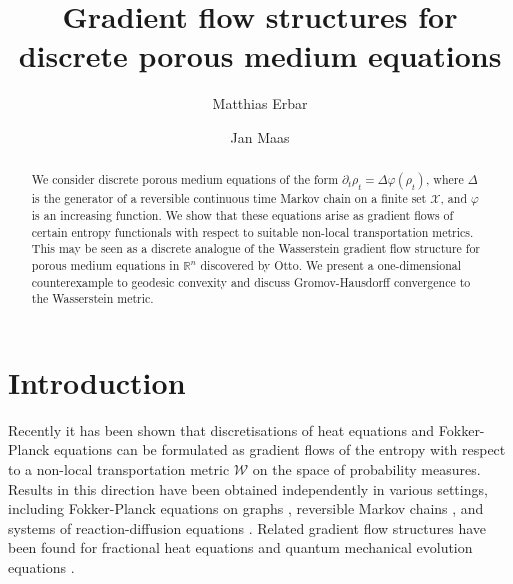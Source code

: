 \documentclass[a4paper,11pt,reqno]{amsart}
\theoremstyle{plain}
\theoremstyle{remark}
\numberwithin{equation}{section}
\begin{document}
\title
[Discrete porous medium equations]
{Gradient flow structures for discrete porous medium equations}

\author{Matthias Erbar}
\author{Jan Maas}
\address{
University of Bonn\\
Institute for Applied Mathematics\\
Endenicher Allee 60\\
53115 Bonn\\
Germany}


 \begin{abstract}
   We consider discrete porous medium equations of the form
   $\partial_t\rho_t = \Delta {\varphi}(\rho_t)$, where $\Delta$ is the
   generator of a reversible continuous time Markov chain on a finite
   set ${\mathcal{X}}$, and ${\varphi}$ is an increasing function. We show that these
   equations arise as gradient flows of certain entropy functionals
   with respect to suitable non-local transportation metrics.  This
   may be seen as a discrete analogue of the Wasserstein gradient flow
   structure for porous medium equations in ${{\mathbb R}}^n$ discovered by Otto.
   We present a one-dimensional counterexample to geodesic convexity
   and discuss Gromov-Hausdorff convergence to the Wasserstein metric.
 \end{abstract} 

\maketitle
 
 
 
\section{Introduction}
\label{sec:intro}

Recently it has been shown that discretisations of heat equations and
Fokker-Planck equations can be formulated as gradient flows of the
entropy with respect to a non-local transportation metric ${\mathcal{W}}$ on the
space of probability measures. Results in this direction have been
obtained independently in various settings, including Fokker-Planck
equations on graphs \cite{CHLZ11}, reversible Markov chains
\cite{Ma11}, and systems of reaction-diffusion equations
\cite{Mie11a}. Related gradient flow structures have been found for
fractional heat equations \cite{Erb12} and quantum mechanical
evolution equations \cite{CaMa12,Mie12}.
\end{document}

